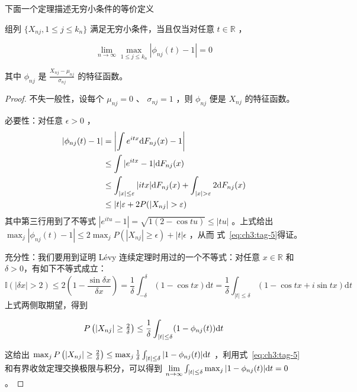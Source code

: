 下面一个定理描述无穷小条件的等价定义

\begin{lemma}

\label{lem:ch3:3-8}

组列 $\{X_{nj},1\le j\le k_n\}$ 满足无穷小条件，当且仅当对任意 $t\in\mathbb R$ ，

\begin{equation}
\label{eq:ch3:tag-5}
\lim_{n\to\infty}\max_{1\le j\le k_n}|\phi_{nj}(t)-1|=0
\end{equation}

其中 $\phi_{nj}$ 是 $\frac{X_{nj}-\mu_{nj}}{\sigma_{nj}}$ 的特征函数。

\end{lemma}

\begin{proof}

不失一般性，设每个 $\mu_{nj}=0$ 、 $\sigma_{nj}=1$ ，则 $\phi_{nj}$ 便是 $X_{nj}$ 的特征函数。

必要性：对任意 $\epsilon>0$ ，
\[\begin{aligned} |\phi_{nj}(t) - 1| &= \left| \int e^{itx} {\rm d}F_{nj}(x) - 1 \right| \\ &\le \int |e^{itx} - 1| {\rm d}F_{nj}(x)\\ &\le \int_{|x| \le \varepsilon} |itx| {\rm d}F_{nj}(x) + \int_{|x| > \varepsilon} 2  {\rm d}F_{nj}(x)\\ &\le |t| \varepsilon + 2 P(|X_{nj}| > \varepsilon) \end{aligned}\]
其中第三行用到了不等式 $|e^{itu}-1|=\sqrt{1(2-\cos tu)}\le |tu|$ 。上式给出 $\max_j|\phi_{nj}(t)-1|\le 2\max_j P(|X_{nj}|\ge\epsilon)+|t|\epsilon$ ，从而 式~\eqref{eq:ch3:tag-5}得证。

充分性：我们要用到证明 Lévy 连续定理时用过的一个不等式：对任意 $x \in \mathbb{R}$ 和 $\delta > 0$，有如下不等式成立：
\[\mathbb{I}(|\delta x| > 2) \le 2\left(1 - \frac{\sin \delta x}{\delta x}\right) = \frac{1}{\delta} \int_{-\delta}^{\delta} (1 - \cos t x) \mathrm dt = \frac{1}{\delta} \int_{|t|\le \delta} (1 - \cos t x+i\sin tx) \mathrm dt\]
上式两侧取期望，得到

\begin{equation}
\label{eq:ch3:tag-6}
\begin{aligned} P\left(|X_{nj}|\ge\tfrac2\delta\right)\le \frac1\delta\int_{|t|\le\delta}(1-\phi_{nj}(t)){\rm d}t \end{aligned}
\end{equation}

这给出 $\max_jP\left(|X_{nj}|\ge\tfrac2\delta\right)\le \max_j\frac1\delta\int_{|t|\le\delta}|1-\phi_{nj}(t)|{\rm d}t$ ，利用式~\eqref{eq:ch3:tag-5} 和有界收敛定理交换极限与积分，可以得到 $\lim\limits_{n\to\infty}\int_{|t|\le\delta}\max_j|1-\phi_{nj}(t)|{\rm d}t=0$ 。

\end{proof}

